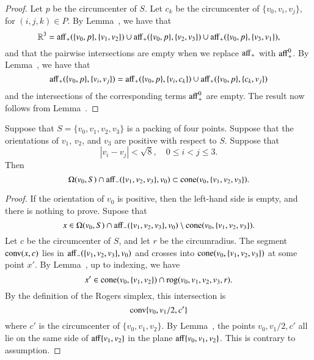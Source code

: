 \begin{tarskidata}
\begin{tarski}
\begin{proof} Let $p$ be the circumcenter of $S$.  Let $c_k$
be the circumcenter of $\{v_0,v_i,v_j\}$, for $(i,j,k)\in P$.
By Lemma~, we have that
   $$
   \mathbb{R}^3 = {\operatorname{aff}}_+(\{v_0,p\},\{v_1,v_2\}) \cup
     {\operatorname{aff}}_+(\{v_0,p\},\{v_2,v_3\}) \cup
     {\operatorname{aff}}_+(\{v_0,p\},\{v_3,v_1\}),
   $$
and that the pairwise intersections are empty when we replace
${\operatorname{aff}}_+$ with ${\operatorname{aff}}_+^0$.  By Lemma~,
we have that 
  $$
  {\operatorname{aff}}_+(\{v_0,p\},\{v_i,v_j\}) =
{\operatorname{aff}}_+(\{v_0,p\},\{v_i,c_k\}) \cup
{\operatorname{aff}}_+(\{v_0,p\},\{c_k,v_j\})
  $$
and the intersections of the corresponding terms ${\operatorname{aff}}_+^0$ 
are empty.
The result now follows from Lemma~.
\end{proof}
\end{tarski}





\begin{tarski}

\begin{lemma}
Suppose that $S=\{v_0,v_1,v_2,v_3\}$ is a packing
of four points.  Suppose that
the orientations of $v_1$, $v_2$, and $v_3$ are positive with respect
to $S$.  Suppose that
  $$
  |v_i - v_j | < \sqrt8, \quad 0\le i < j \le 3.
  $$
Then
  $$
  \Omega(v_0,S) \cap {\operatorname{aff}}_-(\{v_1,v_2,v_3\},v_0) \subset
  {\operatorname{cone}}(v_0,\{v_1,v_2,v_3\}).
  $$
\end{lemma}




\begin{proof}  If the orientation of $v_0$ is positive,
then the left-hand side is empty, and there is nothing to prove.
Supose that 
 $$x\in
   \Omega(v_0,S) \cap {\operatorname{aff}}_-(\{v_1,v_2,v_3\},v_0)
   \setminus
  {\operatorname{cone}}(v_0,\{v_1,v_2,v_3\}).
 $$
Let $c$ be the circumcenter of $S$, and let $r$ be the
circumradius.  The segment ${\operatorname{conv}}(x,c)$
lies in ${\operatorname{aff}}_-(\{v_1,v_2,v_3\},v_0)$ and crosses into
${\operatorname{cone}}(v_0,\{v_1,v_2,v_3\})$ at some point $x'$.  
By Lemma~, up to indexing,
we have 
  $$x'\in{\operatorname{cone}}(v_0,\{v_1,v_2\})\cap{\operatorname{rog}}(v_0,v_1,v_2,v_3,r).$$
By the definition of the Rogers simplex, this intersection is
  $${\operatorname{conv}}\{v_0,v_1/2,c'\}$$
where $c'$ is the circumcenter of $\{v_0,v_1,v_2\}$.
By Lemma~, the points $v_0,v_1/2,c'$ all lie
on the same side of ${\operatorname{aff}}\{v_1,v_2\}$ in the plane ${\operatorname{aff}}\{v_0,v_1,v_2\}$.  This is contrary to assumption.
\end{proof}
\end{tarski}




\end{tarskidata}
